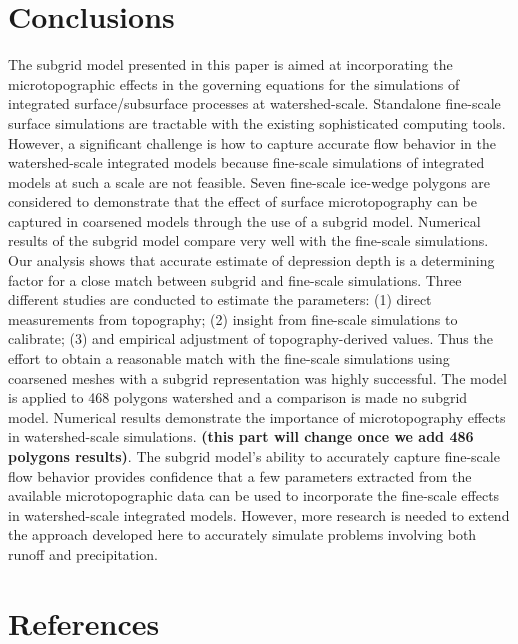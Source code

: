 \documentclass[review,11pt]{elsarticle}
\begin{document}
\section{Conclusions}\label{conclusion}

The subgrid model presented in this paper is aimed at incorporating the microtopographic effects in the governing equations for the simulations of integrated surface/subsurface processes at watershed-scale. Standalone fine-scale surface simulations are tractable with the existing sophisticated computing tools. However, a significant challenge is how to capture accurate flow behavior in the watershed-scale integrated models because fine-scale simulations of integrated models at such a scale are not feasible.
Seven fine-scale ice-wedge polygons are considered to demonstrate that the effect of surface microtopography can be captured in coarsened models through the use of a subgrid model. Numerical results of the subgrid model compare very well with the fine-scale simulations. Our analysis shows that accurate estimate of depression depth is a determining factor for a close match between subgrid and fine-scale simulations.
Three different studies are conducted to estimate the parameters: (1) direct measurements from topography; (2) insight from fine-scale simulations to calibrate; (3) and empirical adjustment of topography-derived values. 
Thus the effort to obtain a reasonable match with the fine-scale simulations using coarsened meshes with a subgrid representation was highly successful. The model is applied to 468 polygons watershed and a comparison is made no subgrid model. Numerical results demonstrate the importance of microtopography effects in watershed-scale simulations. \textbf{(this part will change once we add 486 polygons results)}.
The subgrid model's ability to accurately capture fine-scale flow behavior provides confidence that a few parameters extracted from the available microtopographic data can be used to incorporate the fine-scale effects in watershed-scale integrated models.
However, more research is needed to extend the approach developed here to accurately simulate problems involving both runoff and precipitation.


\section*{References}


\end{document}

